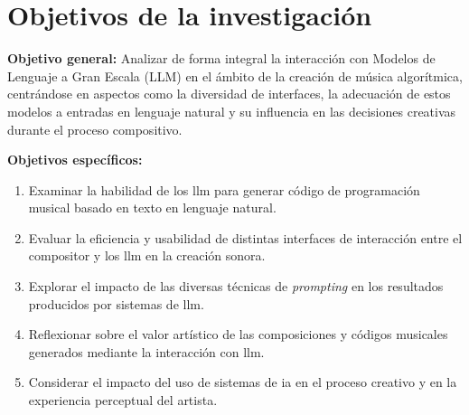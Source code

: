 \section{Objetivos de la investigación}



\textbf{Objetivo general:} Analizar de forma integral la interacción con Modelos de Lenguaje a Gran Escala (LLM) en el ámbito de la creación de música algorítmica, centrándose en aspectos como la diversidad de interfaces, la adecuación de estos modelos a entradas en lenguaje natural y su influencia en las decisiones creativas durante el proceso compositivo.

\textbf{Objetivos específicos:}
\begin{enumerate}[label=\alph*)]
    \item Examinar la habilidad de los \gls{llm} para generar código de programación musical basado en texto en lenguaje natural.
    \item Evaluar la eficiencia y usabilidad de distintas interfaces de interacción entre el compositor y los \gls{llm} en la creación sonora.
    \item Explorar el impacto de las diversas técnicas de \emph{prompting} en los resultados producidos por sistemas de \gls{llm}.
    \item Reflexionar sobre el valor artístico de las composiciones y códigos musicales generados mediante la interacción con \gls{llm}.
    \item Considerar el impacto del uso de sistemas de \gls{ia} en el proceso creativo y en la experiencia perceptual del artista.
\end{enumerate}

